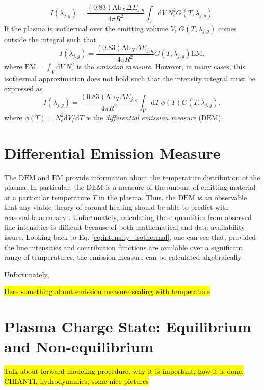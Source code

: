 \begin{equation}
	I(\lambda_{j,g}) = \frac{(0.83)\mathrm{Ab}_X\Delta E_{j,g}}{4\pi R^2}\int_V\mathrm{d}V~N_e^2G(T,\lambda_{j,g}).
\end{equation}
If the plasma is isothermal over the emitting volume $V$, $G(T,\lambda_{j,g})$ comes outside the integral such that 
\begin{equation}
	\label{eq:intensity_isothermal}
	I(\lambda_{j,g}) = \frac{(0.83)\mathrm{Ab}_X\Delta E_{j,g}}{4\pi R^2}G(T,\lambda_{j,g})\mathrm{EM},
\end{equation}
where $\mathrm{EM}=\int_V\mathrm{d}V~N_e^2$ is the \textit{emission measure}. However, in many cases, this isothermal approximation does not hold such that the intensity integral must be expressed as 
\begin{equation}
	I(\lambda_{j,g}) = \frac{(0.83)\mathrm{Ab}_X\Delta E_{j,g}}{4\pi R^2}\int_V\mathrm{d}T~\phi(T)G(T,\lambda_{j,g}),
\end{equation}
where $\phi(T)=N_e^2\mathrm{d}V/\mathrm{d}T$ is the \textit{differential emission measure} ($\mathrm{DEM}$). 
\section{Differential Emission Measure}
\label{sec:dem}
%
\par The $\mathrm{DEM}$ and $\mathrm{EM}$ provide information about the temperature distribution of the plasma. In particular, the $\mathrm{DEM}$ is a measure of the amount of emitting material at a particular temperature $T$ in the plasma. Thus, the $\mathrm{DEM}$ is an observable that any viable theory of coronal heating should be able to predict with reasonable accuracy \citep{golub_solar_2010}.  Unfortunately, calculating these quantities from observed line intensities is difficult because of both mathematical and data availability issues. Looking back to Eq. \ref{eq:intensity_isothermal}, one can see that, provided the line intensities and contribution functions are available over a significant range of temperatures, the emission measure can be calculated algebraically. 
%
\par Unfortunately, 
%
\par \hl{Here something about emission measure scaling with temperature}
\section{Plasma Charge State: Equilibrium and Non-equilibrium}
\label{sec:charge_state}
%
\par \hl{Talk about forward modeling procedure, why it is important, how it is done, CHIANTI, hydrodynamics, some nice pictures}